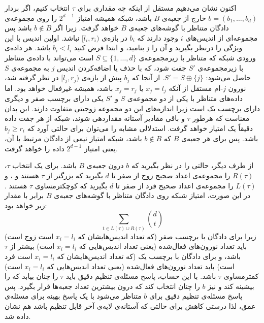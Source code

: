 اکنون نشان می‌دهیم مستقل از اینکه چه مقداری برای $\tau$ انتخاب کنیم، اگر بردار
${b = (b_1, \dots, b_d)}$
خارج از جعبه‌ی $B$ باشد، شبکه همیشه امتیاز $2^{d-1}$ را روی مجموعه‌ی دادگان متناظر با گوشه‌های جعبه‌ی $B$ خواهد گرفت. زیرا اگر $b \not\in B$ باشد پس مجموعه‌ای از اندیس‌های $i$ وجود دارند که $b_i$ در بازه‌ی
$[l_i, r_i)$
نباشد. اولین اندیس با این ویژگی را درنظر بگیرید و آن را $j$ بنامید، و ابتدا فرض کنید $b_i < l_i$ باشد.
هر داده‌ی ورودی شبکه که متناظر با زیرمجموعه‌ی
$S \subseteq \{1, \dots, d\}$
است می‌تواند با داده‌ی متناظر با زیرمجموعه‌ی $S'$ جفت شود، که با حذف یا اضافه‌کردن اندیس $j$ به مجموعه‌ی $S$ حاصل می‌شود:
$S' = S \oplus \{j\}$.
از آنجا که $b_j$ پیش از بازه‌ی
$[l_j, r_j)$
در نظر گرفته شد، نورون $j$-ام مستقل از آنکه
$x_j = l_j$
یا
$x_j = r_j$
باشد، همیشه غیرفعال خواهد بود. اما داده‌های متناظر با یکی از دو مجموعه‌ی $S$ و $S'$ یکی دارای برچسب صفر و دیگری دارای برچسب یک است زیرا اندازه‌های این دو مجموعه زوجیتی متفاوت دارند. ابن بدان معناست که هرطور $\tau$ و باقی مقادیر آستانه مقداردهی شوند، شبکه از هر جفت داده دقیقاً یک امتیاز خواهد گرفت. استدلالی مشابه را می‌توان برای حالتی آورد که $b_j \ge r_i$ باشد. پس برای هر جعبه‌ی $B$ که $b \not\in B$ باشد، شبکه امتیاز نیمی از دادگان مرتبط با آن، یعنی امتیاز $2^{d-1}$ داده را خواهد گرفت.

از طرف دیگر، حالتی را در نظر بگیرید که $b$ درون جعبه‌ی $B$ باشد. برای یک انتخاب $\tau$،
$R(\tau)$
را مجموعه‌ی اعداد صحیح زوج از صفر تا $d$ بگیرید که بزرگتر از $\tau$ هستند و
، و
$L(\tau)$
را مجموعه‌ی اعداد صحیح فرد از صفر تا $d$ بگیرید که کوچکترمساوی $\tau$ هستند
. در این صورت، امتیاز شبکه روی دادگان متناظر با گوشه‌های جعبه‌ی $B$ برابر با مقدار زیر خواهد بود:
\begin{equation} \label{eq:threshold-last-layer}
	\sum_{t \in L(\tau) \cup R(\tau)} \binom{d}{t}
\end{equation}
زیرا برای دادگان با برچسب صفر (که تعداد اندیس‌هایشان که $x_i=l_i$ است زوج است) باید تعداد نورون‌های فعال‌شده (یعنی تعداد اندیس‌هایی که $x_i=l_i$ است) بیشتر از $\tau$ باشد، و برای دادگان با برچسب یک (که تعداد اندیس‌هایشان که $x_i=l_i$ است فرد است) باید تعداد نورون‌های فعال‌شده (یعنی تعداد اندیس‌هایی که $x_i=l_i$ است) کمترمساوی $\tau$ باشد. با این حساب، پاسخ مسئله‌ی تنظیم دقیق باید $\tau$ را چنان بیابد که  را بیشینه کند و نیز $b$ را چنان انتخاب کند که درون بیشترین تعداد جعبه‌ها قرار بگیرد. پس پاسخ مسئله‌ی تنظیم دقیق برای $b$ متناظر می‌شود با یک پاسخ بهینه برای مسئله‌ی عمق، لذا درستی کاهش برای حالتی که آستانه‌ی لایه‌ی آخر قابل تنظیم باشد هم نشان داده شد.

